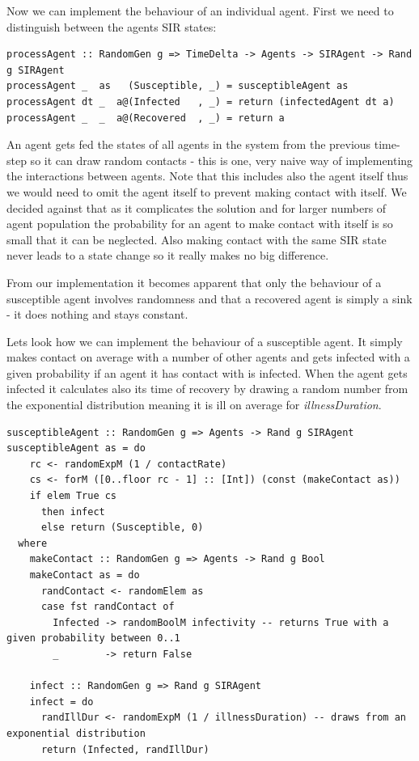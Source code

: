 Now we can implement the behaviour of an individual agent. First we need to distinguish between the agents SIR states:

\begin{verbatim}
processAgent :: RandomGen g => TimeDelta -> Agents -> SIRAgent -> Rand g SIRAgent
processAgent _  as   (Susceptible, _) = susceptibleAgent as
processAgent dt _  a@(Infected   , _) = return (infectedAgent dt a)
processAgent _  _  a@(Recovered  , _) = return a
\end{verbatim}

An agent gets fed the states of all agents in the system from the previous time-step so it can draw random contacts - this is one, very naive way of implementing the interactions between agents. Note that this includes also the agent itself thus we would need to omit the agent itself to prevent making contact with itself. We decided against that as it complicates the solution and for larger numbers of agent population the probability for an agent to make contact with itself is so small that it can be neglected. Also making contact with the same SIR state never leads to a state change so it really makes no big difference.

From our implementation it becomes apparent that only the behaviour of a susceptible agent involves randomness and that a recovered agent is simply a sink - it does nothing and stays constant.

Lets look how we can implement the behaviour of a susceptible agent. It simply makes contact on average with a number of other agents and gets infected with a given probability if an agent it has contact with is infected.
When the agent gets infected it calculates also its time of recovery by drawing a random number from the exponential distribution meaning it is ill on average for \textit{illnessDuration}.

\begin{verbatim}
susceptibleAgent :: RandomGen g => Agents -> Rand g SIRAgent
susceptibleAgent as = do
    rc <- randomExpM (1 / contactRate)
    cs <- forM ([0..floor rc - 1] :: [Int]) (const (makeContact as))
    if elem True cs
      then infect
      else return (Susceptible, 0)
  where
    makeContact :: RandomGen g => Agents -> Rand g Bool
    makeContact as = do
      randContact <- randomElem as
      case fst randContact of
        Infected -> randomBoolM infectivity -- returns True with a given probability between 0..1
        _        -> return False

    infect :: RandomGen g => Rand g SIRAgent
    infect = do
      randIllDur <- randomExpM (1 / illnessDuration) -- draws from an exponential distribution
      return (Infected, randIllDur)
\end{verbatim}

